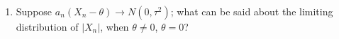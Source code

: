 \begin{problem}[DasGupta 7.31 (a)]
  \begin{enumerate}[label=(\alph*),noitemsep]
  \item Suppose \(a_n(X_n-\theta)\to N(0,\tau^2)\); what can be said
    about the limiting distribution of \(|X_n|\), when \(\theta\neq 0\),
    \(\theta=0\)?
  \end{enumerate}
\end{problem}
\begin{solution}

\end{solution}

